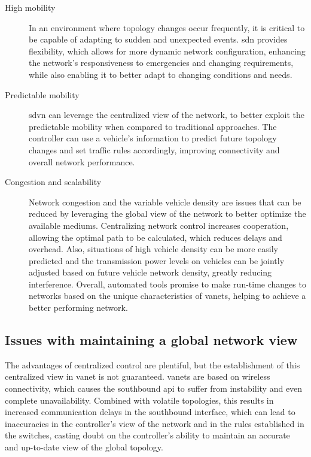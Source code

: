 \begin{description}
    \item[High mobility] In an environment where topology changes occur frequently, it is critical to be capable of adapting to sudden and unexpected events. \gls{sdn} provides flexibility, which allows for more dynamic network configuration, enhancing the network's responsiveness to emergencies and changing requirements, while also enabling it to better adapt to changing conditions and needs\cite{ku_towards_2014}.
    \item[Predictable mobility] \gls{sdvn} can leverage the centralized view of the network, to better exploit the predictable mobility when compared to traditional approaches. The controller can use a vehicle's information to predict future topology changes and set traffic rules accordingly, improving connectivity and overall network performance.  
    \item[Congestion and scalability] Network congestion and the variable vehicle density are issues that can be reduced by leveraging the global view of the network to better optimize the available mediums. Centralizing network control increases cooperation, allowing the optimal path to be calculated, which reduces delays and overhead\cite{smida_efficient_2020}. Also, situations of high vehicle density can be more easily predicted and the transmission power levels on vehicles can be jointly adjusted based on future vehicle network density, greatly reducing interference\cite{smida_efficient_2020}. Overall, automated tools promise to make run-time changes to networks based on the unique characteristics of \glspl{vanet}, helping to achieve a better performing network.
\end{description}

\subsection{Issues with maintaining a global network view}
\label{subsec:issues_with_maintaining_a_global_network_view}

The advantages of centralized control are plentiful, but the establishment of this centralized view in \gls{vanet} is not guaranteed. \glspl{vanet} are based on wireless connectivity, which causes the southbound \gls{api} to suffer from instability and even complete unavailability\cite{cardona_software-defined_2020}. Combined with volatile topologies, this results in increased communication delays in the southbound interface, which can lead to inaccuracies in the controller's view of the network and in the rules established in the switches, casting doubt on the controller's ability to maintain an accurate and up-to-date view of the global topology\cite{ben_jaballah_security_2020}. 

